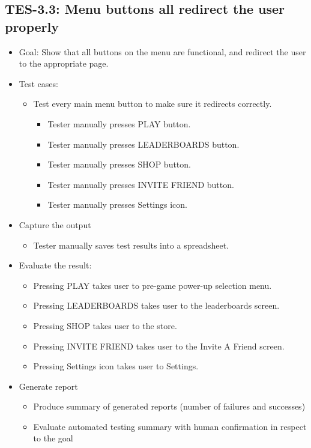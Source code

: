 \subsection{TES-3.3: Menu buttons all redirect the user properly }
\begin{itemize}
\item Goal: Show that all buttons on the menu are functional, and redirect the user to the appropriate page.

\item Test cases: 
\begin{itemize}
\item Test every main menu button to make sure it redirects correctly.
\begin{itemize}
\item Tester manually presses PLAY button.
\item Tester manually presses LEADERBOARDS button.
\item Tester manually presses SHOP button.
\item Tester manually presses INVITE FRIEND button.
\item Tester manually presses Settings icon.
\end{itemize}
\end{itemize}

\item Capture the output
\begin{itemize}
\item Tester manually saves test results into a spreadsheet.
\end{itemize}

\item Evaluate the result: 
\begin{itemize}
\item \label{subsec:select}
Pressing PLAY takes user to pre-game power-up selection menu.
\item Pressing LEADERBOARDS takes user to the leaderboards screen.
\item Pressing SHOP takes user to the store.
\item Pressing INVITE FRIEND takes user to the Invite A Friend screen.
\item Pressing Settings icon takes user to Settings.
\end{itemize}

\item Generate report
\begin{itemize}
\item Produce summary of generated reports (number of failures and successes)
\item Evaluate automated testing summary with human confirmation in respect to the goal
\end{itemize}
\end{itemize}

